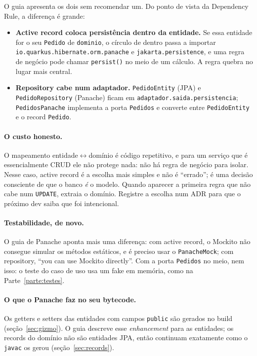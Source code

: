 O guia apresenta os dois sem recomendar um. Do ponto de vista da
Dependency Rule, a diferença é grande:

\begin{itemize}
\item \textbf{Active record coloca persistência dentro da entidade.} Se
  essa entidade for o seu \texttt{Pedido} de \texttt{dominio}, o círculo
  de dentro passa a importar \texttt{io.quarkus.hibernate.orm.panache} e
  \texttt{jakarta.persistence}, e uma regra de negócio pode chamar
  \texttt{persist()} no meio de um cálculo. A regra quebra no lugar mais
  central.
\item \textbf{Repository cabe num adaptador.} \texttt{PedidoEntity} (JPA)
  e \texttt{PedidoRepository} (Panache) ficam em
  \texttt{adaptador.saida.persistencia}; \texttt{PedidosPanache}
  implementa a porta \texttt{Pedidos} e converte entre
  \texttt{PedidoEntity} e o record \texttt{Pedido}.
\end{itemize}

\paragraph{O custo honesto.}
O mapeamento entidade$\leftrightarrow$domínio é código repetitivo, e
para um serviço que é essencialmente CRUD ele não protege nada: não há
regra de negócio para isolar. Nesse caso, active record é a escolha mais
simples e não é \enquote{errado}; é uma decisão consciente de que o
banco \emph{é} o modelo. Quando aparecer a primeira regra que não cabe
num \texttt{UPDATE}, extraia o domínio. Registre a escolha num ADR para
que o próximo dev saiba que foi intencional.

\paragraph{Testabilidade, de novo.}
O guia de Panache aponta mais uma diferença: com active record, o
Mockito não consegue simular os métodos estáticos, e é preciso usar o
\texttt{PanacheMock}; com repository, \enquote{you can use Mockito
directly}. Com a porta \texttt{Pedidos} no meio, nem isso: o teste do
caso de uso usa um fake em memória, como na Parte~\ref{parte:testes}.

\paragraph{O que o Panache faz no seu bytecode.}
Os getters e setters das entidades com campos \texttt{public} são
gerados no build (seção~\ref{sec:gizmo}). O guia descreve esse
\emph{enhancement} para as entidades; os records do domínio não são
entidades JPA, então continuam exatamente como o \texttt{javac} os
gerou (seção~\ref{sec:records}).
